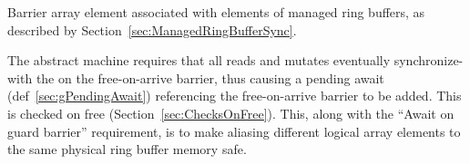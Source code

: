 
Barrier array element associated with elements of managed ring buffers, as described by Section~\ref{sec:ManagedRingBufferSync}.

The abstract machine requires that all reads and mutates eventually synchronize-with the  on the free-on-arrive barrier, thus causing a pending await (def~\ref{sec:gPendingAwait}) referencing the free-on-arrive barrier to be added.
This is checked on free (Section~\ref{sec:ChecksOnFree}).
This, along with the ``Await on guard barrier'' requirement, is to make aliasing different logical array elements to the same physical ring buffer memory safe.


